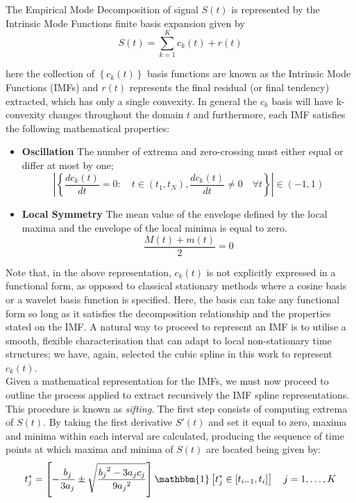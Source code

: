 \begin{defn}

The Empirical Mode Decomposition of signal $S(t)$ is represented by the Intrinsic Mode Functions finite basis expansion given by
\begin{equation}
\label{EMD-for}
S(t) = \sum_{k=1}^K c_k \left(t\right) + r \left(t \right)
\end{equation}

here the collection of $\left\{c_k(t)\right\}$ basis functions are known as the Intrinsic Mode Functions (IMFs) and $r \left(t \right)$ represents the final residual (or final tendency) extracted, which has only a single convexity. In general the $c_k$ basis will have k-convexity changes throughout the domain $t$ and furthermore, each IMF satisfies the following mathematical properties:
\begin{itemize}
\item \textbf{Oscillation} The number of extrema and zero-crossing must either equal or differ at most by one;
\begin{equation}
\left| \left\{ \frac{d c_k (t)}{dt} = 0 : \quad t \in \left( t_1, t_N \right), \frac{d c_k (t)}{dt} \neq 0 \quad \forall t    \right\} \right|  \in  \left( -1, 1 \right)
\end{equation}
\item \textbf{Local Symmetry} The mean value of the envelope defined by the local maxima and the envelope of the local minima is equal to zero.  
\begin{equation}
\frac{M(t) + m(t)}{2} = 0
\end{equation}
\end{itemize}
\end{defn}

\noindent Note that, in the above representation, $c_k(t)$ is not explicitly expressed in a functional form, as opposed to classical stationary methods where a cosine basis or a wavelet basis function is specified. Here, the basis can take any functional form so long as it satisfies the decomposition relationship and the properties stated on the IMF. A natural way to proceed to represent an IMF is to utilise a smooth, flexible characterisation that can adapt to local non-stationary time structures; we have, again, selected the cubic spline in this work to represent  $c_k(t)$.\\
\noindent Given a mathematical representation for the IMFs, we must now proceed to outline the process applied to extract recursively the IMF spline representations. This procedure is known as \textit{sifting}. The first step consists of computing extrema of $S(t)$. By taking the first derivative $S'(t)$ and set it equal to zero, maxima and minima within each interval are calculated, producing the sequence of time points at which maxima and minima of $S(t)$ are located being given by:
\begin{equation}
\label{t_j}
t^*_{j} = \left[ - \frac{b_j}{3 a_j} \pm \sqrt{\frac{{b_j}^2 - 3a_j c_j}{9 {a_j}^2}} \right] \mathbbm{1} \left[ t^*_{j} \in \left[ t_{i-1},t_i \right] \right] \quad j= 1, \dots, K
\end{equation}

